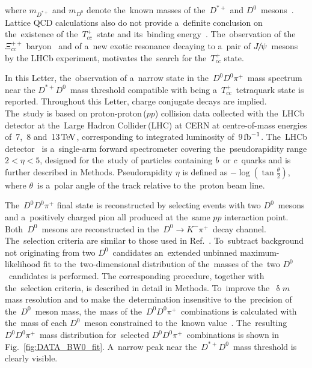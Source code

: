\documentclass[12pt,a4paper]{article}
\def\lhcb   {\mbox{LHCb}\xspace}
\def\Ppi         {\ensuremath{\uppi}\xspace}
\def\Ppsi        {\ensuremath{\uppsi}\xspace}
\def\PXi         {\ensuremath{\Xi}\xspace}
\def\PD      {\ensuremath{\mathrm{D}}\xspace}
\def\PJ      {\ensuremath{\mathrm{J}}\xspace}
\def\PK      {\ensuremath{\mathrm{K}}\xspace}
\def\PT      {\ensuremath{\mathrm{T}}\xspace}
\def\Pb      {\ensuremath{\mathrm{b}}\xspace}
\def\Pc      {\ensuremath{\mathrm{c}}\xspace}
\def\Pp      {\ensuremath{\mathrm{p}}\xspace}
\def\Ppi         {\ensuremath{\pi}\xspace}
\def\Ppsi        {\ensuremath{\psi}\xspace}
\def\PD      {\ensuremath{D}\xspace}
\def\PJ      {\ensuremath{J}\xspace}
\def\PK      {\ensuremath{K}\xspace}
\def\PT      {\ensuremath{T}\xspace}
\def\Pb      {\ensuremath{b}\xspace}
\def\Pc      {\ensuremath{c}\xspace}
\def\Pp      {\ensuremath{p}\xspace}
\def\cquark    {{\ensuremath{\Pc}}\xspace}
\def\bquark    {{\ensuremath{\Pb}}\xspace}
\def\pion   {{\ensuremath{\Ppi}}\xspace}
\def\pip    {{\ensuremath{\pion^+}}\xspace}
\def\kaon    {{\ensuremath{\PK}}\xspace}
\def\Km      {{\ensuremath{\kaon^-}}\xspace}
\def\D       {{\ensuremath{\PD}}\xspace}
\def\Dz      {{\ensuremath{\D^0}}\xspace}
\def\Dstarp  {{\ensuremath{\D^{*+}}}\xspace}
\def\jpsi     {{\ensuremath{{\PJ\mskip -3mu/\mskip -2mu\Ppsi}}}\xspace}
\def\proton      {{\ensuremath{\Pp}}\xspace}
\def\Xires       {{\ensuremath{\PXi}}\xspace}
\def\Xiccpp      {{\ensuremath{\Xires^{++}_{\cquark\cquark}}}\xspace}
\def\to                 {\ensuremath{\rightarrow}\xspace}
\newcommand{\aunit}[1]{\ensuremath{\text{\,#1}}}
\newcommand{\tev}{\aunit{Te\kern -0.1em V}\xspace}
\def\fb   {\ensuremath{\aunit{fb}}\xspace}
\def\invfb   {\ensuremath{\fb^{-1}}\xspace}
\def\Tcc {{{\ensuremath{\PT_{\cquark\cquark}^+}}}\xspace}
\begin{document}
where $m_{\Dstarp}$ and $m_{\Dz}$ denote 
the~known masses of the~$\Dstarp$ and $\Dz$~mesons~\cite{PDG2021}.
Lattice QCD calculations also do not provide 
a~definite conclusion on the~existence 
of the~\Tcc~state 
and its~binding energy~\cite{
Ikeda:2013vwa,
Cheung:2017tnt,
Francis:2018jyb,
Junnarkar:2018twb}.
The~observation of 
the~$\Xiccpp$ baryon~\cite{LHCb-PAPER-2017-018,
LHCb-PAPER-2018-026}
and of a~new exotic resonance decaying to
a~pair of \jpsi~mesons~\cite{LHCb-PAPER-2020-011}
by the \lhcb experiment,
motivates the~search for the~\Tcc state.


In this Letter, the~observation of a~narrow state 
in the~\Dz\Dz\pip~mass 
spectrum near the $\Dstarp\Dz$~mass threshold 
compatible with 
being a~$\Tcc$~tetraquark state is reported.
Throughout this Letter, 
charge conjugate decays are implied.
The~study is based on 
proton\nobreakdash-proton\,($\proton\proton$) 
collision  data collected
with the~LHCb detector 
at the~Large Hadron Collider\,(LHC)
at CERN 
at centre\nobreakdash-of\nobreakdash-mass 
energies of~7,~8 and~13\tev, 
corresponding to integrated
luminosity of~9\invfb. 
The~LHCb detector~\cite{LHCb-DP-2008-001,LHCb-DP-2014-002} 
is a~single-arm forward spectrometer covering 
the~pseudorapidity
range \mbox{$2 < \eta < 5$}, 
designed for the~study of 
particles containing 
\bquark\ or \cquark\ quarks and
is further described in Methods.
Pseudorapidity $\eta$ is defined 
as $-\log \left( \tan \tfrac{\theta}{2}\right) $,
where $\theta$~is a~polar angle of the track relative to
the~proton beam line.



The~$\Dz\Dz\pip$ final state is reconstructed by 
selecting events with two \Dz~mesons and 
a~positively charged pion all produced 
at the~same $\proton\proton$ 
interaction point.
Both~\Dz~mesons are reconstructed 
in the~$\Dz\to\Km\pip$~decay channel. 
The~selection criteria are similar to those 
used in Ref.~\cite{LHCb-PAPER-2012-003}.
To~subtract background not originating 
from two \Dz~candidates
an~extended unbinned 
maximum\nobreakdash-likelihood fit to 
the~two\nobreakdash-dimensional distribution of
the~masses of the~two \Dz~candidates 
is performed. 
The corresponding procedure, 
together with the~selection criteria, is described in detail in Methods.
To~improve the~$\updelta m$  mass resolution and to make
the~determination insensitive 
to the~precision of the~\Dz~meson mass, 
the~mass of the~$\Dz\Dz\pip$~combinations is
calculated with the~mass of each $\Dz$~meson
constrained to the~known value~\cite{PDG2021}.
The~resulting 
$\Dz\Dz\pip$~mass distribution 
for~selected $\Dz\Dz\pip$~combinations
is shown in Fig.~\ref{fig:DATA_BW0_fit}.
A~narrow peak near 
the~$\Dstarp\Dz$~mass threshold is clearly visible. 
\end{document}
